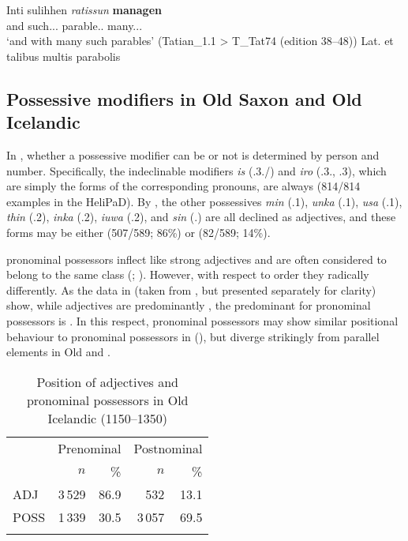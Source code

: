 \documentclass[output=paper,colorlinks,citecolor=brown,draft]{langscibook}
\begin{document}
\ea\label{OHGmanagen}
\gll Inti sulihhen \textit{ratissun} \textbf{managen}\\
	and such.\DAT.\PL.\STR{} parable.\DAT.\PL{} many.\DAT.\PL.\STR{}\\
\glt ‘and with many such parables’ (Tatian\_1.1 > T\_Tat74 (edition 38--48))
\glt Lat. et talibus multis parabolis
\z							

\subsection{Possessive modifiers in Old Saxon and Old Icelandic}\label{ssectPossOSOI}

\begin{sloppypar}
In , whether a possessive modifier can be  or not is determined by person and number. Specifically, the indeclinable modifiers \textit{is} (\POSS.3\SG.\MASC/\N) and \textit{iro} (\POSS.3\SG.\FEM, \POSS.3\PL), which are simply the  forms of the corresponding pronouns, are always  (814/814 examples in the HeliPaD). By , the other possessives \textit{min} (\POSS.1\SG), \textit{unka} (\POSS.1\DU), \textit{usa} (\POSS.1\PL), \textit{thin} (\POSS.2\SG), \textit{inka} (\POSS.2\SG), \textit{iuwa} (\POSS.2\PL), and \textit{sin} (\POSS.\REFL) are all declined as adjectives, and these forms may be either  (507/589; 86\%) or  (82/589; 14\%).
\end{sloppypar}

 pronominal possessors inflect like strong adjectives and are often considered to belong to the same class (\cite[20]{Heltoft10}; \cite{Barnes08}). However, with respect to order they  radically differently. As the data in  (taken from , but presented separately for clarity) show, while adjectives are predominantly , the predominant  for pronominal possessors is . In this respect,  pronominal possessors may show similar positional behaviour to pronominal possessors in  (\cite[see][213]{ratkus2011}), but diverge strikingly from parallel elements in Old  and .

\begin{table}
\caption{Position of adjectives and pronominal possessors in Old Icelandic (1150–1350)}
\label{tabOIAPoss}
\begin{tabular}{l rr rr}
\lsptoprule
& \multicolumn{2}{c}{Prenominal} & \multicolumn{2}{c}{Postnominal}\\\cmidrule(lr){2-3}\cmidrule(lr){4-5}
& $n$ & \% & $n$ & \%\\\midrule
ADJ & 3\,529 & 86.9 & 532 & 13.1\\
POSS & 1\,339 & 30.5 & 3\,057 & 69.5\\
\lspbottomrule
\end{tabular}
\end{table}
\end{document}
